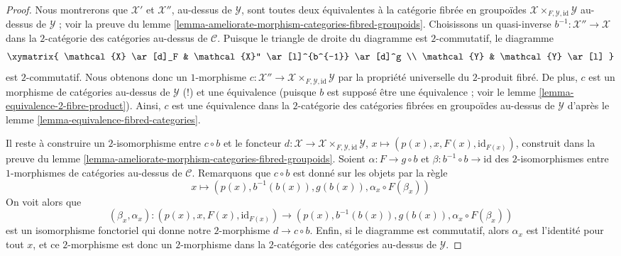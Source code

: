 \begin{proof}
Nous montrerons que $\mathcal{X}'$ et $\mathcal{X}''$, au-dessus de $\mathcal{Y}$,
sont toutes deux équivalentes à la catégorie fibrée en groupoïdes
$\mathcal{X} \times_{F, \mathcal{Y}, \text{id}} \mathcal{Y}$
au-dessus de $\mathcal{Y}$ ; voir la preuve du
lemme \ref{lemma-ameliorate-morphism-categories-fibred-groupoids}.
Choisissons un quasi-inverse $b^{-1} : \mathcal{X}'' \to \mathcal{X}$ dans la
$2$-catégorie des catégories au-dessus de $\mathcal{C}$.
Puisque le triangle de droite du diagramme est $2$-commutatif, le diagramme
$$
\xymatrix{
\mathcal{X} \ar[d]_F & \mathcal{X}'' \ar[l]^{b^{-1}} \ar[d]^g \\
\mathcal{Y} & \mathcal{Y} \ar[l]
}
$$
est $2$-commutatif. Nous obtenons donc un $1$-morphisme
$c : \mathcal{X}'' \to
\mathcal{X} \times_{F, \mathcal{Y}, \text{id}} \mathcal{Y}$
par la propriété universelle du $2$-produit fibré. De plus, $c$
est un morphisme de catégories au-dessus de $\mathcal{Y}$ (!) et une équivalence
(puisque $b$ est supposé être une équivalence ; voir le
lemme \ref{lemma-equivalence-2-fibre-product}).
Ainsi, $c$ est une équivalence dans la $2$-catégorie des catégories fibrées
en groupoïdes au-dessus de $\mathcal{Y}$ d'après le
lemme \ref{lemma-equivalence-fibred-categories}.

\medskip\noindent
Il reste à construire un $2$-isomorphisme entre $c \circ b$ et
le foncteur $d : \mathcal{X} \to
\mathcal{X} \times_{F, \mathcal{Y}, \text{id}} \mathcal{Y}$,
$x \mapsto (p(x), x, F(x), \text{id}_{F(x)})$,
construit dans la preuve du
lemme \ref{lemma-ameliorate-morphism-categories-fibred-groupoids}.
Soient $\alpha : F \to g \circ b$ et $\beta : b^{-1} \circ b \to \text{id}$
des $2$-isomorphismes entre $1$-morphismes de catégories au-dessus de $\mathcal{C}$.
Remarquons que $c \circ b$ est donné sur les objets par la règle
$$
x \mapsto (p(x), b^{-1}(b(x)), g(b(x)), \alpha_x \circ F(\beta_x))
$$
On voit alors que
$$
(\beta_x, \alpha_x) :
(p(x), x, F(x), \text{id}_{F(x)})
\longrightarrow
(p(x), b^{-1}(b(x)), g(b(x)), \alpha_x \circ F(\beta_x))
$$
est un isomorphisme fonctoriel qui donne notre $2$-morphisme
$d \to c \circ b$. Enfin, si le diagramme est commutatif, alors
$\alpha_x$ est l'identité pour tout $x$, et ce
$2$-morphisme est donc un $2$-morphisme dans la $2$-catégorie des catégories
au-dessus de $\mathcal{Y}$.
\end{proof}


































